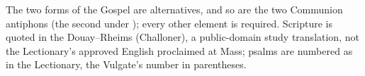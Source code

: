 \vspace{0.2em}
{\footnotesize\noindent The two forms of the Gospel are alternatives, and so
are the two Communion antiphons (the second under ); every other
element is required. Scripture is quoted in the Douay--Rheims (Challoner), a
public-domain study translation, not the Lectionary's approved English
proclaimed at Mass; psalms are numbered as in the Lectionary, the Vulgate's
number in parentheses.\par}
